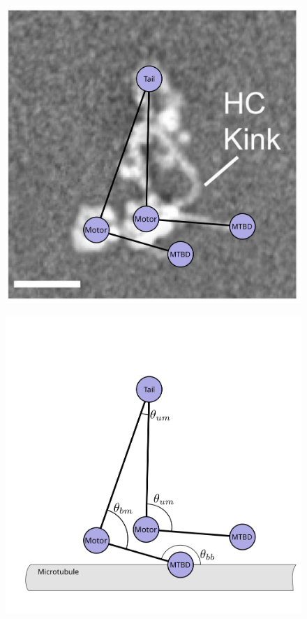 \documentclass[9pt,twocolumn,twoside,lineno]{pnas-new}
\begin{document}
\begin{figure}
\begin{minipage}{.3\textwidth}
   \label{fig:modlengths}
 \end{minipage}%
 \begin{minipage}{.3\textwidth}
   \centering
   \includegraphics[width=\linewidth]{figures/schematic-2-superimposed}
   \label{fig:modlengths}
 \end{minipage}%
 \begin{minipage}{.3\textwidth}
   \centering
   \includegraphics[width=\linewidth]{figures/schematic-2-model}

\end{minipage}
\end{figure}
\end{document}
